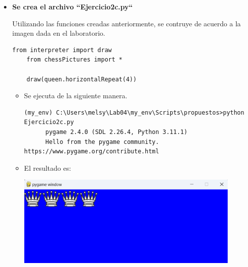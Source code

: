 \documentclass{article}
\begin{document}
\begin{itemize}
  \pagebreak

  \item \textbf{Se crea el archivo ``Ejercicio2c.py``}
  
  \vspace{\baselineskip}

  Utilizando las funciones creadas anteriormente, se contruye de acuerdo a la imagen dada en el laboratorio.

    \begin{lstlisting}[style=python]
    from interpreter import draw
    from chessPictures import *

    draw(queen.horizontalRepeat(4))
    \end{lstlisting}

    \vspace{\baselineskip}

    \begin{itemize}
      \item Se ejecuta de la siguiente manera.

      \begin{lstlisting}[style=shell]
      (my_env) C:\Users\melsy\Lab04\my_env\Scripts\propuestos>python Ejercicio2c.py
      pygame 2.4.0 (SDL 2.26.4, Python 3.11.1)
      Hello from the pygame community. https://www.pygame.org/contribute.html
      \end{lstlisting}

      \vspace{2\baselineskip}

      \item El resultado es:
      
      \vspace{\baselineskip}

      \begin{minipage}{\linewidth}
        \centering
        \includegraphics[width=0.9\textwidth]{imagenes/p_ej2c.png}
      \end{minipage}
    \end{itemize}


\end{itemize}
\end{document}
